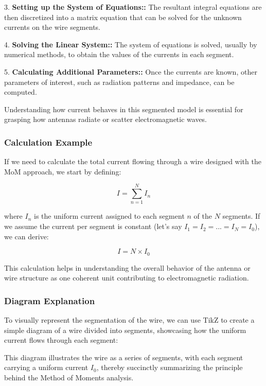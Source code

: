 3. \textbf{Setting up the System of Equations::} The resultant integral equations are then discretized into a matrix equation that can be solved for the unknown currents on the wire segments.

4. \textbf{Solving the Linear System::} The system of equations is solved, usually by numerical methods, to obtain the values of the currents in each segment.

5. \textbf{Calculating Additional Parameters::} Once the currents are known, other parameters of interest, such as radiation patterns and impedance, can be computed.

Understanding how current behaves in this segmented model is essential for grasping how antennas radiate or scatter electromagnetic waves. 

\subsubsection{Calculation Example}

If we need to calculate the total current flowing through a wire designed with the MoM approach, we start by defining:

\[
I = \sum_{n=1}^{N} I_n
\]

where \(I_n\) is the uniform current assigned to each segment \(n\) of the \(N\) segments. If we assume the current per segment is constant (let's say \(I_1 = I_2 = ... = I_N = I_0\)), we can derive:

\[
I = N \times I_0
\]

This calculation helps in understanding the overall behavior of the antenna or wire structure as one coherent unit contributing to electromagnetic radiation.

\subsubsection{Diagram Explanation}

To visually represent the segmentation of the wire, we can use TikZ to create a simple diagram of a wire divided into segments, showcasing how the uniform current flows through each segment:

\begin{center}
\end{center}

This diagram illustrates the wire as a series of segments, with each segment carrying a uniform current \(I_0\), thereby succinctly summarizing the principle behind the Method of Moments analysis.
